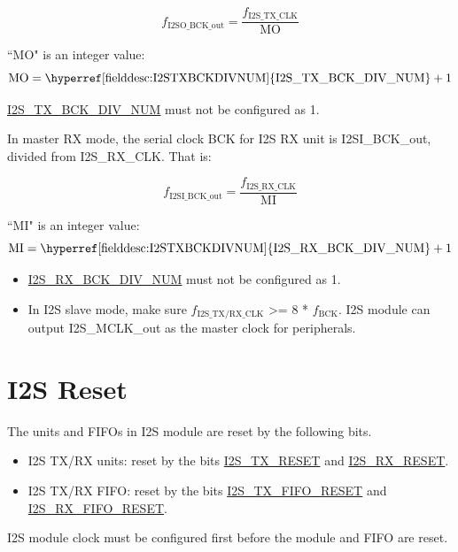 \documentclass[main\_\_EN.tex]{subfiles}
\begin{document}
$$f_{\textrm{I2SO\_BCK\_out}} = \frac{f_{\textrm{I2S\_TX\_CLK}}}{\textrm{MO}}$$


``MO" is an integer value:
$$ \textrm{MO} = \textrm{\hyperref[fielddesc:I2STXBCKDIVNUM]{I2S\_TX\_BCK\_DIV\_NUM}} + 1 $$
\vspace{-2em}
\begin{tiplisting}
\hyperref[fielddesc:I2STXBCKDIVNUM]{I2S\_TX\_BCK\_DIV\_NUM} must not be configured as 1.
\end{tiplisting}

In master RX mode, the serial clock BCK for I2S RX unit is I2SI\_BCK\_out, divided from I2S\_RX\_CLK. That is:

$$f_{\textrm{I2SI\_BCK\_out}} = \frac{f_{\textrm{I2S\_RX\_CLK}}}{\textrm{MI}}$$

``MI" is an integer value:
$$ \textrm{MI} = \textrm{\hyperref[fielddesc:I2STXBCKDIVNUM]{I2S\_RX\_BCK\_DIV\_NUM}} + 1 $$

\clearpage
\begin{tiplisting}
\vspace{-2em}
\begin{itemize}
    \item \hyperref[fielddesc:I2SRXBCKDIVNUM]{I2S\_RX\_BCK\_DIV\_NUM} must not be configured as 1.
    \item In I2S slave mode, make sure $f_{\textrm{I2S\_TX/RX\_CLK}}$ >= 8 * $f_{\textrm{BCK}}$. I2S module can output I2S\_MCLK\_out as the master clock for peripherals.
\end{itemize}
\end{tiplisting}

\section{I2S Reset} \label{sec:i2s-reset}

The units and FIFOs in I2S module are reset by the following bits.
\begin{itemize}
\item I2S TX/RX units: reset by the bits  \hyperref[fielddesc:I2STXRESET]{I2S\_TX\_RESET} and  \hyperref[fielddesc:I2SRXRESET]{I2S\_RX\_RESET}.
\item I2S TX/RX FIFO: reset by the bits  \hyperref[fielddesc:I2STXFIFORESET]{I2S\_TX\_FIFO\_RESET} and  \hyperref[fielddesc:I2SRXFIFORESET]{I2S\_RX\_FIFO\_RESET}.
\end{itemize}

\begin{tiplisting}
I2S module clock must be configured first before the module and FIFO are reset.
\end{tiplisting} 
\end{document}
